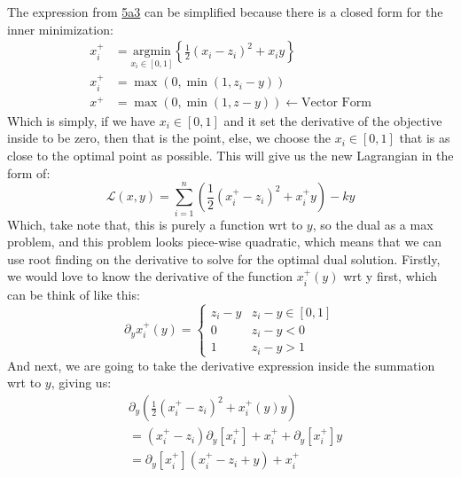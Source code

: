 \documentclass[]{article}
\begin{document}
        The expression from \hyperref[eqn:5a3]{5a3} can be simplified because there is a closed form for the inner minimization: 
        \begin{align*}\tag{5a4}\label{eqn:5a4}
            x_i^+ &= \underset{x_i\in[0, 1]}{\text{argmin}}
            \left\lbrace
                \frac{1}{2}(x_i - z_i)^2 + x_i y
            \right\rbrace
            \\
            x_i^+ &= \max(0, \min(1, z_i - y))
            \\
            x^+ &= \max(0, \min(1, z - y)) \leftarrow \text{Vector Form}
        \end{align*}
        Which is simply, if we have $x_i\in[0,1]$ and it set the derivative of the objective inside to be zero, then that is the point, else, we choose the $x_i\in[0, 1]$ that is as close to the optimal point as possible. This will give us the new Lagrangian in the form of: 
        \begin{equation*}\tag{5a5}\label{eqn:5a5}
            \mathcal{L}(x, y) = 
            \sum_{i=1}^{n}\left(
                \frac{1}{2}(x_i^+ - z_i)^2 + x_i^+y
            \right)
            - ky
        \end{equation*}
        Which, take note that, this is purely a function wrt to $y$, so the dual as a max problem, and this problem looks piece-wise quadratic, which means that we can use root finding on the derivative to solve for the optimal dual solution. 
        Firstly, we would love to know the derivative of the function $x_i^+(y)$ wrt y first, which can be think of like this: 
        \begin{equation*}\tag{5a6}\label{eqn:5a6}
            \partial_y x_i^+(y) = \begin{cases}
                z_i - y & z_i - y\in[0, 1]
                \\
                0  & z_i - y < 0 
                \\
                1 & z_i - y > 1
            \end{cases}
        \end{equation*}
        And next, we are going to take the derivative expression inside the summation wrt to $y$, giving us: 
        \begin{align*}\tag{5a7}\label{eqn:5a7}
            & \partial_{y} \left(
                \frac{1}{2}(x_i^+ - z_i)^2 + x_i^+(y)y            
            \right)
            \\
            &= 
            (x_i^+ - z_i) \partial_y[x_i^{+}]  + x_i^+ + \partial_y[x_i^+]  y
            \\
            &= 
            \partial_y[x_i^{+}](x_i^+ - z_i + y) + x_i^+ 
        \end{align*}
\end{document}

